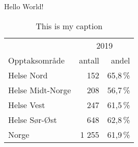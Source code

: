 \documentclass[12pt]{article}
\begin{document}
Hello World!

\begin{table}[h]
\begin{center}
\begin{tabular}{lrr}
\toprule
& \multicolumn{2}{c}{2019}  \\
Opptaksområde & antall & andel \\
\midrule
Helse Nord & 152 & 65,8\,\% \\
Helse Midt-Norge & 208 & 56,7\,\% \\
Helse Vest & 247 & 61,5\,\% \\
Helse Sør-Øst & 648 & 62,8\,\% \\
\midrule
Norge &1 255 & 61,9\,\%\\
\bottomrule
\end{tabular}
\end{center}
\caption{This is my caption}
\end{table}
\end{document}
